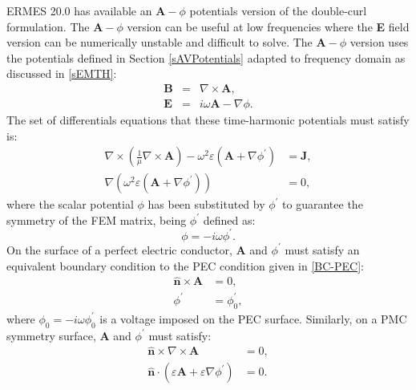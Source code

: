ERMES 20.0 has available an $\textbf{A}-\phi$ potentials version of the double-curl formulation. The $\textbf{A}-\phi$ version can be useful at low frequencies where the \textbf{E} field version can be numerically unstable and difficult to solve. The $\textbf{A}-\phi$ version uses the potentials defined in Section \ref{sAVPotentials} adapted to frequency domain as discussed in \ref{sEMTH}:
\begin{eqnarray}\label{DefPotentialsFD} 
	\mathbf{B} &=& \nabla\times\mathbf{A}, 
	\label{DefBPotentialsFD}
	\\
	\mathbf{E} &=& i\omega\mathbf{A} - \nabla\phi.
	\label{DefEPotentialsFD}
\end{eqnarray}
The set of differentials equations that these time-harmonic potentials must satisfy is:
\begin{equation}\label{CCAVDE}
	\begin{aligned}
		\nabla\times\left(\frac{1}{\mu}\nabla\times\mathbf{A}\right) - \omega^{2}\varepsilon\left(\mathbf{A} + \nabla\phi^{'}\right) &= \mathbf{J},
		\\
		\nabla\left(\omega^{2}\varepsilon\left(\mathbf{A} + \nabla\phi^{'}\right)\right) &= 0,
	\end{aligned}
\end{equation}
where the scalar potential $\phi$ has been substituted by $\phi^{'}$ to guarantee the symmetry of the FEM matrix, being $\phi^{'}$ defined as:
\begin{equation}\label{PhiReDef}
	\phi = -i\omega\phi^{'}.
\end{equation}
On the surface of a perfect electric conductor, $\textbf{A}$ and $\phi^{'}$ must satisfy an equivalent boundary condition to the PEC condition given in \ref{BC-PEC}:
\begin{equation}\label{PEC-AV-CC}
	\begin{aligned}
		\mathbf{\hat{n}}\times\mathbf{A} &= 0,
		\\
		\phi^{'} &= \phi^{'}_{0},
	\end{aligned}
\end{equation}
where $\phi_{0} = -i\omega\phi^{'}_{0}$ is a voltage imposed on the PEC surface. Similarly, on a PMC symmetry surface, $\textbf{A}$ and $\phi^{'}$ must satisfy:
\begin{equation}\label{PMC-AV-CC}
	\begin{aligned}
		\mathbf{\hat{n}}\times\nabla\times\mathbf{A} &= 0,
		\\
		\mathbf{\hat{n}}\cdot\left(\varepsilon\mathbf{A} + \varepsilon\nabla\phi^{'}\right) &= 0.
	\end{aligned}
\end{equation}
